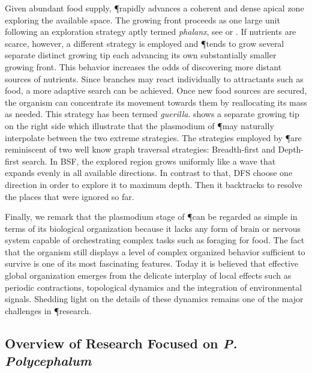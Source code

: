 		Given abundant food supply, \P rapidly advances a coherent and dense apical zone exploring the available space. The growing front proceeds as one large unit following an exploration strategy aptly termed \emph{phalanx}, see  or . If nutrients are scarce, however, a different strategy is employed and \P tends to grow several separate distinct growing tip each advancing its own substantially smaller growing front. This behavior increases the odds of discovering more distant sources of nutrients. Since branches may react individually to attractants such as food, a more adaptive search can be achieved. Once new food sources are secured, the organism can concentrate its movement towards them by reallocating its mass as needed. This strategy has been termed \emph{guerilla}.  shows a separate growing tip on the right side which illustrate that the plasmodium of \P may naturally interpolate between the two extreme strategies. The strategies employed by \P are reminiscent of two well know graph traversal strategies: Breadth-first and Depth-first search. In BSF, the explored region grows uniformly like a wave that expands evenly in all available directions. In contrast to that, DFS choose one direction in order to explore it to maximum depth. Then it backtracks to resolve the places that were ignored so far.

		Finally, we remark that the plasmodium stage of \P can be regarded as simple in terms of its biological organization because it lacks any form of brain or nervous system capable of orchestrating complex tasks such as foraging for food. The fact that the organism still displays a level of complex organized behavior sufficient to survive is one of its most fascinating features. Today it is believed that effective global organization emerges from the delicate interplay of local effects such as periodic contractions, topological dynamics and the integration of environmental signals. Shedding light on the details of these dynamics remains one of the major challenges in \P research.

		\FloatBarrier

	\subsection{Overview of Research Focused on \textit{P. Polycephalum}}


